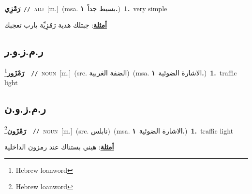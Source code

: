 \documentclass[10pt,a4paper,twoside]{article} %
\begin{document}
\begin{multicols}{2}
{\setlength\topsep{0pt}\textbf{\foreignlanguage{arabic}{رَمْزِي}}\ {\color{gray}\texttt{//}\color{black}}\ \textsc{adj}\ [m.]\ \color{gray}(msa. \foreignlanguage{arabic}{بسيط جداً}~\foreignlanguage{arabic}{\textbf{١.}})\color{black}\ \textbf{1.}~very simple\  \begin{flushright}\color{gray}\foreignlanguage{arabic}{\textbf{\underline{\foreignlanguage{arabic}{أمثلة}}}: جبتلك هدية رَمْزِيِّة يارب تعجبك}\end{flushright}\color{black}} \vspace{2mm}

\vspace{-3mm}
\subsection*{\color{blue}\foreignlanguage{arabic}{ر.م.ز.و.ر}\color{blue}{ (ntws)}} 

{\setlength\topsep{0pt}\textbf{\foreignlanguage{arabic}{رَمْزَور}}\footnote{Hebrew loanword}\ \ {\color{gray}\texttt{//}\color{black}}\ \textsc{noun}\ [m.]\ (src. \color{gray}\foreignlanguage{arabic}{الضفة الغربية}\color{black})\ \color{gray}(msa. \foreignlanguage{arabic}{الاشارة الضوئية}~\foreignlanguage{arabic}{\textbf{١.}})\color{black}\ \textbf{1.}~traffic light\ } \vspace{2mm}

\vspace{-3mm}
\subsection*{\color{blue}\foreignlanguage{arabic}{ر.م.ز.و.ن}\color{blue}{ (ntws)}} 

{\setlength\topsep{0pt}\textbf{\foreignlanguage{arabic}{رَمْزَون}}\footnote{Hebrew loanword}\ \ {\color{gray}\texttt{//}\color{black}}\ \textsc{noun}\ [m.]\ (src. \color{gray}\foreignlanguage{arabic}{نابلس}\color{black})\ \color{gray}(msa. \foreignlanguage{arabic}{الاشارة الضوئية}~\foreignlanguage{arabic}{\textbf{١.}})\color{black}\ \textbf{1.}~traffic light\  \begin{flushright}\color{gray}\foreignlanguage{arabic}{\textbf{\underline{\foreignlanguage{arabic}{أمثلة}}}: هيني بستناك عند رمزون الداخلية}\end{flushright}\color{black}} \vspace{2mm}


\end{multicols}
\end{document}
